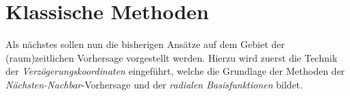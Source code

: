 \section{Klassische Methoden}
Als nächstes sollen nun die bisherigen Ansätze auf dem Gebiet der (raum)zeitlichen Vorhersage vorgestellt werden. Hierzu wird zuerst die Technik der \textit{Verzögerungskoordinaten} eingeführt, welche die Grundlage der Methoden der \textit{Nächsten-Nachbar}-Vorhersage und der \textit{radialen Basisfunktionen} bildet.
 


